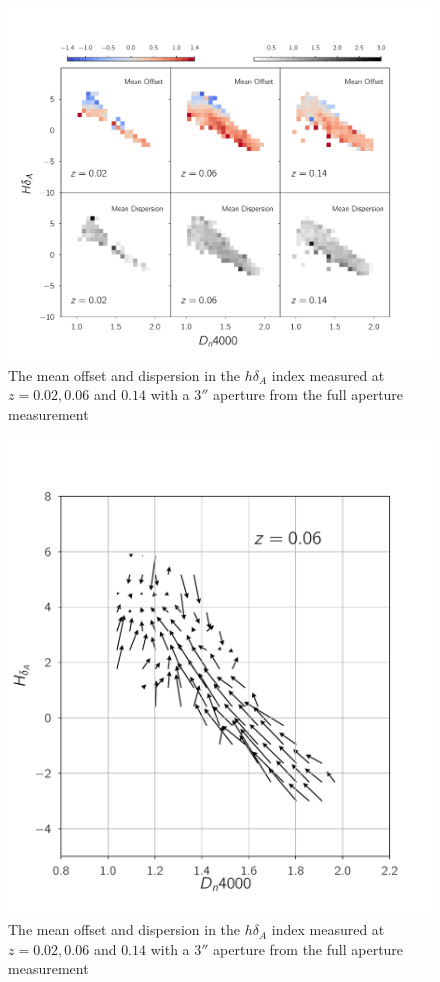 \begin{figure}
\includegraphics[width=\textwidth]{figures/hdelta_full_aperture_comparisons.pdf}
\caption[Short figure name.]{ The mean offset and dispersion in the $h\delta_{A}$ index measured at $z = 0.02,0.06$ and $0.14$ with a $3''$ aperture from the full aperture measurement 
\label{fig:myInlineFigure}}
\end{figure}

\begin{figure}
\includegraphics[width=\textwidth]{figures/quiver_b.pdf}
\caption[Short figure name.]{ The mean offset and dispersion in the $h\delta_{A}$ index measured at $z = 0.02,0.06$ and $0.14$ with a $3''$ aperture from the full aperture measurement 
\label{fig:myInlineFigure}}
\end{figure}

